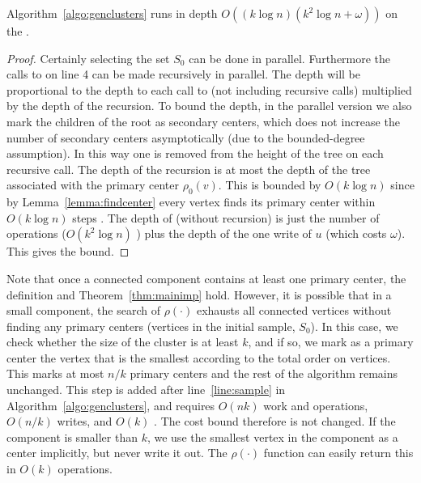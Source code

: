 \begin{lemma}\label{lemma:pargenclusters}
Algorithm~\ref{algo:genclusters} runs in
depth $O((k \log n) (k^2 \log n + \omega))$ \whp{} on the
\ourmodel.
\end{lemma}
\begin{proof}
	Certainly selecting the set $S_0$ can be done in parallel.
	Furthermore the calls to  on line 4 can be
	made recursively in parallel.  The depth will be proportional to the
	depth to each call to  (not including
	recursive calls) multiplied by the depth of the recursion.
	To bound the depth, in the parallel version we also mark the children of the root as secondary centers, which does not increase the number of secondary centers asymptotically (due to the bounded-degree assumption).
	In this way one is removed from the height of the tree on each recursive call.
	The depth of the recursion is at most the depth of the tree
	associated with the primary center $\rho_0(v)$.  This is bounded by
	$O(k \log n)$ \whp{} since by Lemma~\ref{lemma:findcenter} every
	vertex finds its primary center within $O(k \log n)$ steps \whp{}.
	The depth of  (without recursion) is just the
	number of operations ($O(k^2 \log n)$ \whp{}) plus the depth of the one
	write of $u$ (which costs $\omega$).  This gives the bound.
\end{proof}



 Note that once a
connected component contains at least one primary center, the
definition and Theorem~\ref{thm:mainimp} hold.  However, it is
possible that in a small component, the search of $\rho(\cdot)$
exhausts all connected vertices without finding any primary centers
(vertices in the initial sample, $S_0$).  In this case, we check
whether the size of the cluster is at least $k$, and if so, we mark as
a primary center the vertex that is the smallest according to the
total order on vertices.
This marks at most $n/k$ primary centers and the rest of the algorithm
remains unchanged.  This step is added after line~\ref{line:sample} in
Algorithm~\ref{algo:genclusters}, and requires $O(nk)$ work and
operations, $O(n/k)$ writes, and $O(k)$ \depth.  The cost bound
therefore is not changed.  If the component is smaller than $k$, we
use the smallest vertex in the component as a center implicitly, but
never write it out.  The $\rho(\cdot)$ function can easily return this
in $O(k)$ operations.

